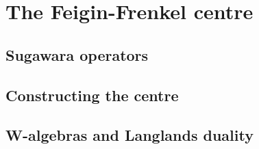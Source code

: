 \section{The Feigin-Frenkel centre} \label{section: feigin_frenkel_centres}
    \subsection{Sugawara operators}

    \subsection{Constructing the centre}

    \subsection{W-algebras and Langlands duality}